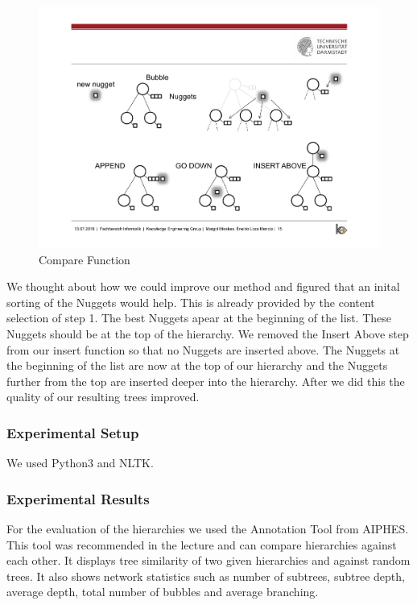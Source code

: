 \begin{figure}[H]
	\centering
	\includegraphics[trim=22.5cm 12.5cm 2.5cm 5.5cm, clip=true]{img/step2_func.pdf}
	\caption{Compare Function}
	\label{fig:jsd}
\end{figure}


We thought about how we could improve our method and figured that an inital sorting of the Nuggets would help. This is already provided by the content selection of step 1. The best Nuggets apear at the beginning of the list. These Nuggets should be at the top of the hierarchy. We removed the Insert Above step from our insert function so that no Nuggets are inserted above. The Nuggets at the beginning of the list are now at the top of our hierarchy and the Nuggets further from the top are inserted deeper into the hierarchy. After we did this the quality of our resulting trees improved.

\subsubsection{Experimental Setup}

We used Python3 and NLTK.

\subsubsection{Experimental Results}


For the evaluation of the hierarchies we used the Annotation Tool from AIPHES. This tool was recommended in the lecture and can compare hierarchies against each other. It displays tree similarity of two given hierarchies and against random trees. It also shows network statistics such as number of subtrees, subtree depth, average depth, total number of bubbles and average branching.


